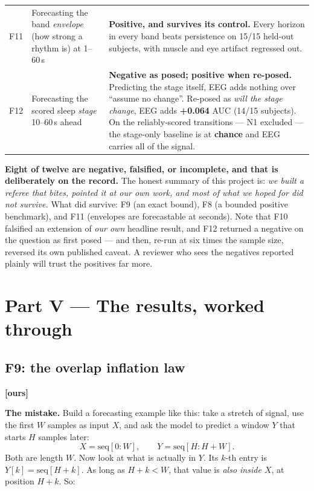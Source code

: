 \documentclass[11pt]{article}
\begin{document}
\begin{center}
\begin{longtable}{p{}p{}p{}}
F11 & Forecasting the band \emph{envelope} (how strong a rhythm is) at 1--60\,s & \textbf{Positive, and survives its control.} Every horizon in every band beats persistence on 15/15 held-out subjects, with muscle and eye artifact regressed out. \\
F12 & Forecasting the scored sleep \emph{stage} 10--60\,s ahead & \textbf{Negative as posed; positive when re-posed.} Predicting the stage itself, EEG adds nothing over ``assume no change''. Re-posed as \emph{will the stage change}, EEG adds \textbf{+0.064} AUC (14/15 subjects). On the reliably-scored transitions --- N1 excluded --- the stage-only baseline is at \textbf{chance} and EEG carries all of the signal. \\
\bottomrule
\end{longtable}
\end{center}

\begin{keybox}
\textbf{Eight of twelve are negative, falsified, or incomplete, and that is
deliberately on the record.} The honest summary of this project is: \emph{we
built a referee that bites, pointed it at our own work, and most of what we hoped
for did not survive.} What did survive: F9 (an exact bound), F8 (a bounded
positive benchmark), and F11 (envelopes are forecastable at seconds). Note that
F10 falsified an extension of \emph{our own} headline result, and F12 returned a
negative on the question as first posed --- and then, re-run at six times the
sample size, reversed its own published caveat. A reviewer who sees the
negatives reported plainly will trust the positives far more.
\end{keybox}

\section{Part V --- The results, worked through}

\subsection{F9: the overlap inflation law} \textbf{[ours]}

\textbf{The mistake.} Build a forecasting example like this: take a stretch of
signal, use the first $W$ samples as input $X$, and ask the model to predict a
window $Y$ that starts $H$ samples later:
\begin{equation}
X = \mathrm{seq}[0 : W], \qquad Y = \mathrm{seq}[H : H+W].
\end{equation}
Both are length $W$. Now look at what is actually in $Y$. Its $k$-th entry is
$Y[k] = \mathrm{seq}[H+k]$. As long as $H+k < W$, that value is \emph{also inside
$X$}, at position $H+k$. So:
\end{document}
